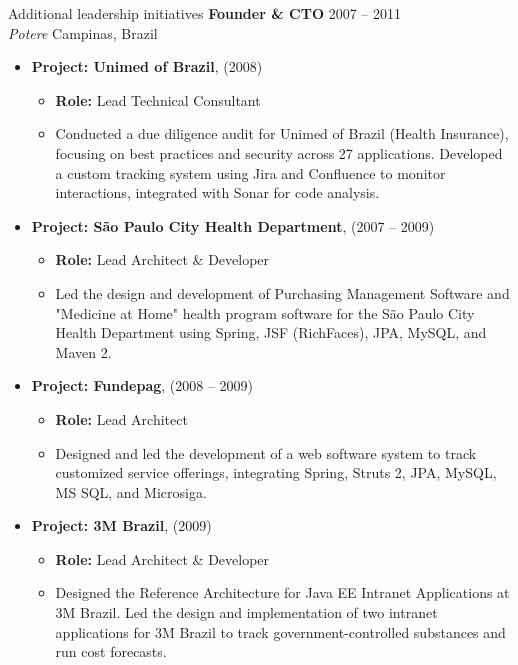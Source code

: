 \documentclass{resume} %
\begin{document}
\begin{rSection}{Additional leadership initiatives}
\textbf{Founder \& CTO} \hfill 2007 -- 2011\\
\textit{Potere} \hfill Campinas, Brazil\\
\begin{itemize}
    \item \textbf{Project: Unimed of Brazil}, \hfill (2008)
    \begin{itemize}
        \item \textbf{Role:} Lead Technical Consultant
        \item Conducted a due diligence audit for Unimed of Brazil (Health Insurance), focusing on best practices and security across 27 applications. Developed a custom tracking system using Jira and Confluence to monitor interactions, integrated with Sonar for code analysis.
    \end{itemize}

    \item \textbf{Project: São Paulo City Health Department}, \hfill (2007 -- 2009)
    \begin{itemize}
        \item \textbf{Role:} Lead Architect \& Developer
        \item Led the design and development of Purchasing Management Software and "Medicine at Home" health program software for the São Paulo City Health Department using Spring, JSF (RichFaces), JPA, MySQL, and Maven 2.
    \end{itemize}

    \item \textbf{Project: Fundepag}, \hfill (2008 -- 2009)
    \begin{itemize}
        \item \textbf{Role:} Lead Architect
        \item Designed and led the development of a web software system to track customized service offerings, integrating Spring, Struts 2, JPA, MySQL, MS SQL, and Microsiga.
    \end{itemize}

    \item \textbf{Project: 3M Brazil}, \hfill (2009)
    \begin{itemize}
        \item \textbf{Role:} Lead Architect \& Developer
        \item Designed the Reference Architecture for Java EE Intranet Applications at 3M Brazil. Led the design and implementation of two intranet applications for 3M Brazil to track government-controlled substances and run cost forecasts.
    \end{itemize}


\end{itemize}
\end{rSection}
\end{document}
